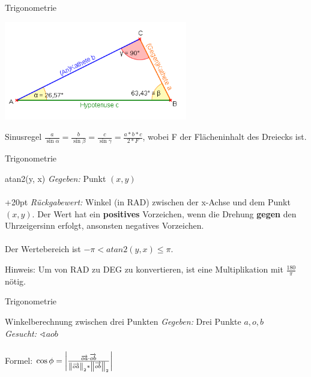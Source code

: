 \begin{frame}{Trigonometrie}
	\begin{center}
		\includegraphics[width=0.6\textwidth,height=.8\textheight,keepaspectratio]{dreieck.png}
	\end{center}
	
	\begin{block}{Sinusregel}
		$\frac{a}{\sin \alpha} = \frac{b}{\sin \beta} = \frac{c}{\sin \gamma} = \frac{a * b * c}{2 * F}$,
		wobei F der Flächeninhalt des Dreiecks ist.
	\end{block}
\end{frame}

\begin{frame}{Trigonometrie}
	\begin{block}{atan2(y, x)}
		\textit{Gegeben:} Punkt $(x,y)$\\ \ \\
		
		\hangindent+20pt 
		\textit{Rückgabewert:} Winkel (in RAD) zwischen der x-Achse und dem Punkt $(x,y)$. Der Wert hat ein \textbf{positives} Vorzeichen, wenn die Drehung \textbf{gegen} den Uhrzeigersinn erfolgt, ansonsten negatives Vorzeichen.\\ \ \\

		Der Wertebereich ist $-\pi < atan2(y, x) \leq \pi$.
	\end{block}
	
	Hinweis: Um von RAD zu DEG zu konvertieren, ist eine Multiplikation mit $\frac{180}{\pi}$ nötig.
\end{frame}

\begin{frame}{Trigonometrie}
	\begin{block}{Winkelberechnung zwischen drei Punkten}
		\textit{Gegeben:} Drei Punkte $a, o, b$\\
		\textit{Gesucht:} $\sphericalangle aob$\\ \ \\

		Formel: $\cos \phi = \left|\frac{\overrightarrow{oa} \cdot \overrightarrow{ob}}{\left\|\overrightarrow{oa}\right\|_2 * \left\|\overrightarrow{ob}\right\|_2}\right|$\\
	\end{block}
	
	\lstset{
		language=C++,
		tabsize=1
	}
	
\end{frame}
